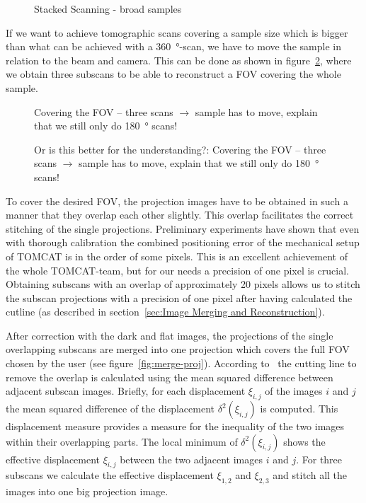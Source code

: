 \begin{figure}
	\centering
	
	\caption{Stacked Scanning - broad samples}
	\label{fig:widefield-scanning}
\end{figure}

If we want to achieve tomographic scans covering a sample size which is bigger than what can be achieved with a \SI{360}{\degree}-scan, we have to move the sample in relation to the beam and camera. This can be done as shown in figure~\ref{fig:covering-three scans a},  where we obtain three subscans to be able to reconstruct a FOV covering the whole sample.

\begin{figure}
	\centering
	
	\caption{Covering the FOV -- three scans $\rightarrow$ sample has to move, explain that we still only do \SI{180}{\degree} scans!}
	\label{fig:covering-three scans a}
\end{figure}

\begin{figure}
	\centering
	
	\caption{Or is this better for the understanding?: Covering the FOV -- three scans $\rightarrow$ sample has to move, explain that we still only do \SI{180}{\degree} scans!}
	\label{fig:covering-three scans b}
\end{figure}

To cover the desired FOV, the projection images have to be obtained in such a manner that they overlap each other slightly. This overlap facilitates the correct stitching of the single projections. Preliminary experiments have shown that even with thorough calibration the combined positioning error of the mechanical setup of TOMCAT is in the order of some pixels. This is an excellent achievement of the whole TOMCAT-team, but for our needs a precision of one pixel is crucial. Obtaining subscans with an overlap of approximately 20 pixels allows us to stitch the subscan projections with a precision of one pixel after having calculated the cutline (as described in section~\ref{sec:Image Merging and Reconstruction}).

After correction with the dark and flat images, the projections of the single overlapping subscans are merged into one projection which covers the full FOV chosen by the user (see figure~\ref{fig:merge-proj}). According to~\citet{Hintermueller2009} the cutting line to remove the overlap is calculated using the mean squared difference between adjacent subscan images. Briefly, for each displacement $\xi_{i,j}$ of the images $i$ and $j$ the mean squared difference of the displacement $\delta^2(\xi_{i,j})$ is computed. This displacement measure provides a measure for the inequality of the two images within their overlapping parts. The local minimum of $\delta^2(\xi_{i,j})$ shows the effective displacement $\xi_{i,j}$ between the two adjacent images $i$ and $j$. For three subscans we calculate the effective displacement $\xi_{1,2}$ and $\xi_{2,3}$ and stitch all the images into one big projection image.

